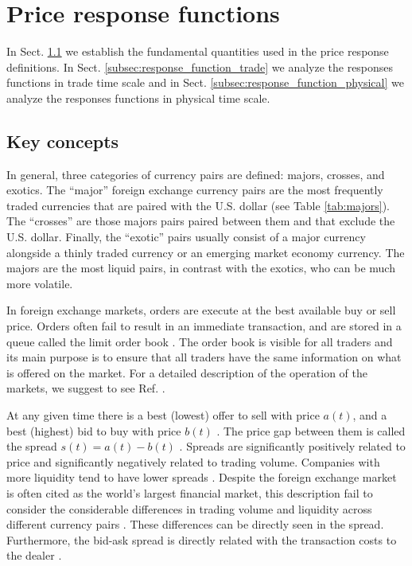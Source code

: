\section{Price response functions}
\label{sec:response_functions}
In Sect. \ref{subsec:key_concepts} we establish the fundamental quantities used
in the price response definitions.
In Sect. \ref{subsec:response_function_trade} we analyze the responses
functions in trade time scale and in Sect. \ref{subsec:response_function_physical}
we analyze the responses functions in physical time scale.

\subsection{Key concepts}\label{subsec:key_concepts}

In general, three categories of currency pairs are defined: majors, crosses,
and exotics. The ``major'' foreign exchange currency pairs are the most
frequently traded currencies that are paired with the U.S. dollar (see Table
\ref{tab:majors}). The ``crosses'' are those majors pairs paired between them
and that exclude the U.S. dollar. Finally, the ``exotic'' pairs usually consist
of a major currency alongside a thinly traded currency or an emerging market
economy currency. The majors are the most liquid pairs, in contrast with the
exotics, who can be much more volatile.

In foreign exchange markets, orders are execute at the best available buy or
sell price. Orders often fail to result in an immediate transaction, and are
stored in a queue called the limit order book
\cite{stat_prop,predictive_pow,forex_structure,intro_market_micro,forex_market_micro,prop_order_book}.
The order book is visible for all traders and its main purpose is to ensure
that all traders have the same information on what is offered on the market.
For a detailed description of the operation of the markets, we suggest to see
Ref. \cite{my_paper_response_financial}.

At any given time there is a best (lowest) offer to sell with price
$a\left(t\right)$, and a best (highest) bid to buy with price $b\left(t\right)$
\cite{subtle_nature,account_spread,limit_ord_spread,prop_order_book,stat_theory}.
The price gap between them is called the spread
$s\left(t\right) = a\left(t\right)-b\left(t\right)$
\cite{subtle_nature,market_digest,Bouchaud_2004,account_spread,teach_spread,large_prices_changes,em_stylized_facts,stat_theory}.
Spreads are significantly positively related to price and significantly
negatively related to trading volume. Companies with more liquidity tend to
have lower spreads
\cite{components_spread_tokyo,effects_spread,account_spread,components_spread}.
Despite the foreign exchange market is often cited as the world's largest
financial market, this description fail to consider the considerable differences
in trading volume and liquidity across different currency pairs
\cite{forex_microstructure}. These differences can be directly seen in the
spread. Furthermore, the bid-ask spread is directly related with the
transaction costs to the dealer \cite{teach_spread,spread_futures}.

